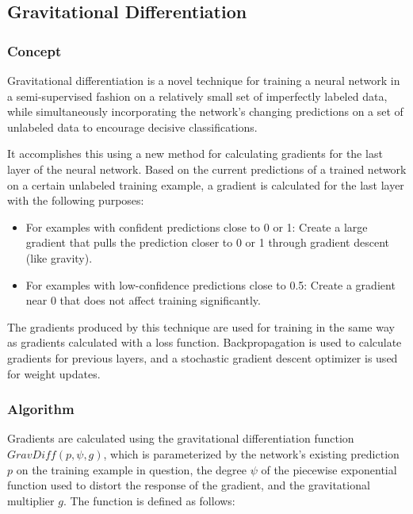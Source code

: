 \documentclass[10pt]{article}
\begin{document}
\subsection{Gravitational Differentiation}

\subsubsection{Concept}

Gravitational differentiation is a novel technique for training a neural network in a semi-supervised fashion on a relatively small set of imperfectly labeled data, while simultaneously incorporating the network's changing predictions on a set of unlabeled data to encourage decisive classifications.

It accomplishes this using a new method for calculating gradients for the last layer of the neural network. Based on the current predictions of a trained network on a certain unlabeled training example, a gradient is calculated for the last layer with the following purposes:

\begin{itemize}
    \item For examples with confident predictions close to 0 or 1: Create a large gradient that pulls the prediction closer to 0 or 1 through gradient descent (like gravity).
    \item For examples with low-confidence predictions close to 0.5: Create a gradient near 0 that does not affect training significantly.
\end{itemize}

The gradients produced by this technique are used for training in the same way as gradients calculated with a loss function. Backpropagation is used to calculate gradients for previous layers, and a stochastic gradient descent optimizer is used for weight updates.

\subsubsection{Algorithm}

Gradients are calculated using the gravitational differentiation function $GravDiff(p, \psi, g)$, which is parameterized by the network's existing prediction $p$ on the training example in question, the degree $\psi$ of the piecewise exponential function used to distort the response of the gradient, and the gravitational multiplier $g$. The function is defined as follows:
\end{document}
